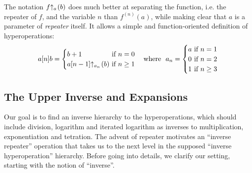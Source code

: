 The notation $\rf{f}{a}(b)$ does much better at separating the function, i.e. the repeater of $f$, and the variable $n$ than $f^{(n)}(a)$, while making clear that $a$ is a parameter of \emph{repeater} itself. It allows a simple and function-oriented definition of hyperoperations:
\begin{equation}
a[n]b = \begin{cases}
b + 1 & \hspace{-10pt}\text{ if } n = 0 \\
\rf{a[n-1]}{a_n}(b) & \hspace{-10pt}\text{ if } n \ge 1
\end{cases}
\ \ \text{ where } \ a_n = \begin{cases}
a & \hspace{-10pt}\text{ if } n = 1 \\
0 & \hspace{-10pt}\text{ if } n = 2 \\
1 & \hspace{-10pt}\text{ if } n \ge 3
\end{cases}
\end{equation}

\subsection{The Upper Inverse and Expansions}

Our goal is to find an inverse hierarchy to the hyperoperations, which should include division, logarithm and iterated logarithm as inverses to multiplication, exponentiation and tetration. The advent of repeater motivates an ``inverse repeater'' operation that takes us to the next level in the supposed ``inverse hyperoperation'' hierarchy. Before going into details, we clarify our setting, starting with the notion of ``inverse''.

